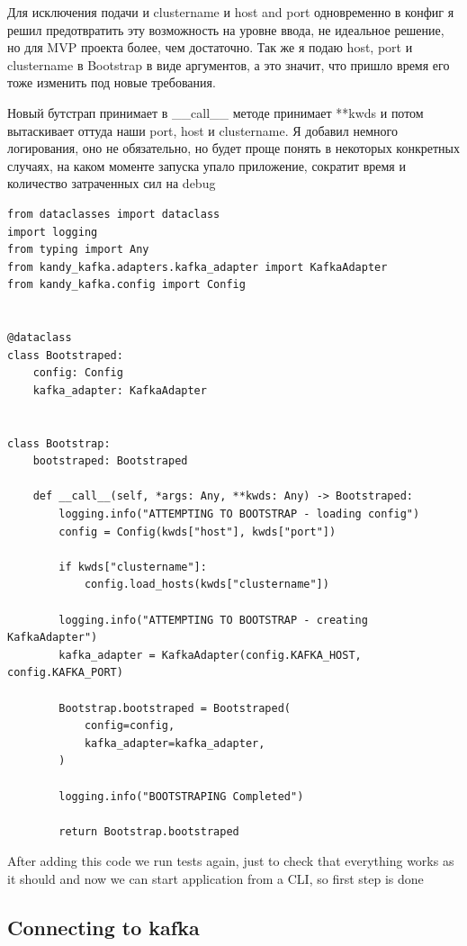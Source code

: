 \documentclass[10pt , a4paper]{report}
\newenvironment{code}{\captionsetup{type=listing}}{}
\begin{document}
Для исключения подачи и clustername и host and port одновременно в конфиг я решил предотвратить эту возможность на уровне ввода, не идеальное решение, но для MVP проекта более, чем достаточно. Так же я подаю host, port и clustername в Bootstrap в виде аргументов, а это значит, что пришло время его тоже изменить под новые требования.

Новый бутстрап принимает в \_\_call\_\_ методе принимает **kwds и потом вытаскивает оттуда наши port, host и clustername. Я добавил немного логирования, оно не обязательно, но будет проще понять в некоторых конкретных случаях, на каком моменте запуска упало приложение, сократит время и количество затраченных сил на debug

\begin{code}
  \begin{verbatim}
from dataclasses import dataclass
import logging
from typing import Any
from kandy_kafka.adapters.kafka_adapter import KafkaAdapter
from kandy_kafka.config import Config


@dataclass
class Bootstraped:
    config: Config
    kafka_adapter: KafkaAdapter


class Bootstrap:
    bootstraped: Bootstraped

    def __call__(self, *args: Any, **kwds: Any) -> Bootstraped:
        logging.info("ATTEMPTING TO BOOTSTRAP - loading config")
        config = Config(kwds["host"], kwds["port"])

        if kwds["clustername"]:
            config.load_hosts(kwds["clustername"])

        logging.info("ATTEMPTING TO BOOTSTRAP - creating KafkaAdapter")
        kafka_adapter = KafkaAdapter(config.KAFKA_HOST, config.KAFKA_PORT)

        Bootstrap.bootstraped = Bootstraped(
            config=config,
            kafka_adapter=kafka_adapter,
        )

        logging.info("BOOTSTRAPING Completed")

        return Bootstrap.bootstraped
  \end{verbatim}
\end{code}

After adding this code we run tests again, just to check that everything works as it should and now we can start application from a CLI, so first step is done

\subsection{Connecting to kafka}
\end{document}
